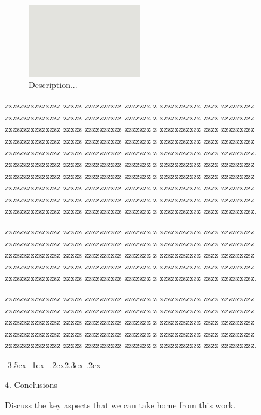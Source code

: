 \documentclass[prl,twocolumn]{revtex4-1}
\makeatletter
\renewcommand{\section}{\@startsection{section}{1}{\z@}%
	{-3.5ex \@plus -1ex \@minus -.2ex}{2.3ex \@plus.2ex}%
	{\normalfont\bfseries\raggedright}}
\numberwithin{equation}{section}
\makeatother
\begin{document}
\begin{figure}[!tb]
  \includegraphics[width=0.44\textwidth]{fig1a.png}
  \caption{Description...}
  \label{fig:z}
\end{figure}


  zzzzzzzzzzzzzzz zzzzz zzzzzzzzzz zzzzzzz z zzzzzzzzzzz zzzz zzzzzzzzz
  zzzzzzzzzzzzzzz zzzzz zzzzzzzzzz zzzzzzz z zzzzzzzzzzz zzzz zzzzzzzzz
  zzzzzzzzzzzzzzz zzzzz zzzzzzzzzz zzzzzzz z zzzzzzzzzzz zzzz zzzzzzzzz
  zzzzzzzzzzzzzzz zzzzz zzzzzzzzzz zzzzzzz z zzzzzzzzzzz zzzz zzzzzzzzz
  zzzzzzzzzzzzzzz zzzzz zzzzzzzzzz zzzzzzz z zzzzzzzzzzz zzzz zzzzzzzzz.
  zzzzzzzzzzzzzzz zzzzz zzzzzzzzzz zzzzzzz z zzzzzzzzzzz zzzz zzzzzzzzz
  zzzzzzzzzzzzzzz zzzzz zzzzzzzzzz zzzzzzz z zzzzzzzzzzz zzzz zzzzzzzzz
  zzzzzzzzzzzzzzz zzzzz zzzzzzzzzz zzzzzzz z zzzzzzzzzzz zzzz zzzzzzzzz
  zzzzzzzzzzzzzzz zzzzz zzzzzzzzzz zzzzzzz z zzzzzzzzzzz zzzz zzzzzzzzz
  zzzzzzzzzzzzzzz zzzzz zzzzzzzzzz zzzzzzz z zzzzzzzzzzz zzzz zzzzzzzzz.
  
  zzzzzzzzzzzzzzz zzzzz zzzzzzzzzz zzzzzzz z zzzzzzzzzzz zzzz zzzzzzzzz
  zzzzzzzzzzzzzzz zzzzz zzzzzzzzzz zzzzzzz z zzzzzzzzzzz zzzz zzzzzzzzz
  zzzzzzzzzzzzzzz zzzzz zzzzzzzzzz zzzzzzz z zzzzzzzzzzz zzzz zzzzzzzzz
  zzzzzzzzzzzzzzz zzzzz zzzzzzzzzz zzzzzzz z zzzzzzzzzzz zzzz zzzzzzzzz
  zzzzzzzzzzzzzzz zzzzz zzzzzzzzzz zzzzzzz z zzzzzzzzzzz zzzz zzzzzzzzz.

  


  zzzzzzzzzzzzzzz zzzzz zzzzzzzzzz zzzzzzz z zzzzzzzzzzz zzzz zzzzzzzzz
  zzzzzzzzzzzzzzz zzzzz zzzzzzzzzz zzzzzzz z zzzzzzzzzzz zzzz zzzzzzzzz
  zzzzzzzzzzzzzzz zzzzz zzzzzzzzzz zzzzzzz z zzzzzzzzzzz zzzz zzzzzzzzz
  zzzzzzzzzzzzzzz zzzzz zzzzzzzzzz zzzzzzz z zzzzzzzzzzz zzzz zzzzzzzzz
  zzzzzzzzzzzzzzz zzzzz zzzzzzzzzz zzzzzzz z zzzzzzzzzzz zzzz zzzzzzzzz.

\section{4. Conclusions}

Discuss the key aspects that we can take home from this work.
\end{document}
